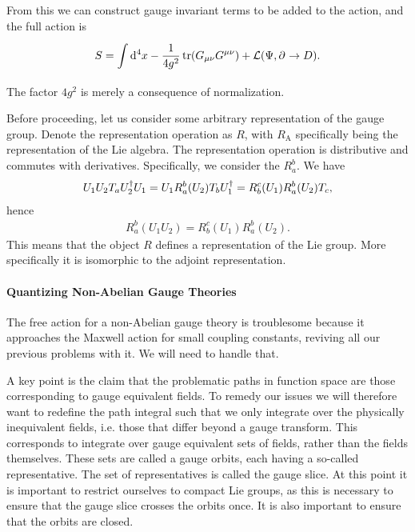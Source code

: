 From this we can construct gauge invariant terms to be added to the action, and the full action is
\begin{align*}
S = \int\limits_{}^{}\dd[4]{x}-\frac{1}{4g^{2}}\tr(G_{\mu\nu}G^{\mu\nu}) + \mathcal{L}(\Psi, \partial^{}_{}\to D).
\end{align*}
The factor $4g^{2}$ is merely a consequence of normalization.

Before proceeding, let us consider some arbitrary representation of the gauge group. Denote the representation operation as $R$, with $R_{\text{A}}$ specifically being the representation of the Lie algebra. The representation operation is distributive and commutes with derivatives. Specifically, we consider the $R_{a}^{b}$. We have
\begin{align*}
U_{1}U_{2}T_{a}U_{2}^{\dagger} U_{1} = U_{1}R_{a}^{b}(U_{2})T_{b}U_{1}^{\dagger} = R_{b}^{c}(U_{1})R_{a}^{b}(U_{2})T_{c},
\end{align*}
hence
\begin{align*}
R_{a}^{b}(U_{1}U_{2}) = R_{b}^{c}(U_{1})R_{a}^{b}(U_{2}).
\end{align*}
This means that the object $R$ defines a representation of the Lie group. More specifically it is isomorphic to the adjoint representation.

\paragraph{Quantizing Non-Abelian Gauge Theories}
The free action for a non-Abelian gauge theory is troublesome because it approaches the Maxwell action for small coupling constants, reviving all our previous problems with it. We will need to handle that.

A key point is the claim that the problematic paths in function space are those corresponding to gauge equivalent fields. To remedy our issues we will therefore want to redefine the path integral such that we only integrate over the physically inequivalent fields, i.e. those that differ beyond a gauge transform. This corresponds to integrate over gauge equivalent sets of fields, rather than the fields themselves. These sets are called a gauge orbits, each having a so-called representative. The set of representatives is called the gauge slice. At this point it is important to restrict ourselves to compact Lie groups, as this is necessary to ensure that the gauge slice crosses the orbits once. It is also important to ensure that the orbits are closed.

